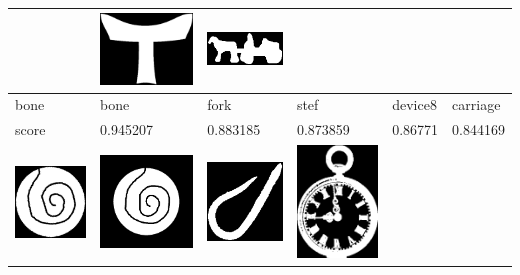 \begin{table}[h!]
\begin{tabular}{ | m{2.2cm} | m{2.2cm} | m{2.2cm} | m{2.2cm} | m{2.2cm} | m{2.2cm} | }
\begin{minipage}{.3\textwidth}
    \end{minipage}
	&
    \begin{minipage}{.3\textwidth}
      \includegraphics[width=\linewidth, width=20mm]{images/device8}
    \end{minipage}
	&
    \begin{minipage}{.3\textwidth}
      \includegraphics[width=\linewidth, width=20mm]{images/carriage}
    \end{minipage}
	\\ \hline
	bone & bone & fork & stef & device8 & carriage \\ \hline
	score & 0.945207 & 0.883185 & 0.873859 & 0.86771 & 0.844169 \\ \hline
	\begin{minipage}{.3\textwidth}
      \includegraphics[width=\linewidth, width=20mm]{images/test-device9}
    \end{minipage}
    &
    \begin{minipage}{.3\textwidth}
      \includegraphics[width=\linewidth, width=20mm]{images/device9-6-object}
    \end{minipage}
    & 
    \begin{minipage}{.3\textwidth}
      \includegraphics[width=\linewidth, width=20mm]{images/sea_snake}
    \end{minipage}
	&
	\begin{minipage}{.3\textwidth}
      \includegraphics[width=\linewidth, width=20mm]{images/pocket}

\end{minipage}
\end{tabular}
\end{table}
